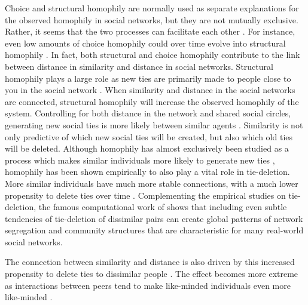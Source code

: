 \documentclass[11pt]{article}
\begin{document}
Choice and structural homophily are normally used as separate explanations for the observed homophily in social networks, but they are not mutually exclusive. Rather, it seems that the two processes can facilitate each other \cite{asikainen_cumulative_2020}. For instance, even low amounts of choice homophily could over time evolve into structural homophily \cite{asikainen_cumulative_2020,kossinets_origins_2009,taylor_exploring_2018}.
In fact, both structural and choice homophily contribute to the link between distance in similarity and distance in social networks. Structural homophily plays a large role as new ties are primarily made to people close to you in the social network \cite{bianconi_triadic_2014, peixoto_disentangling_2022}. When similarity and distance in the social networks are connected, structural homophily will increase the observed homophily of the system. Controlling for both distance in the network and shared social circles, generating new social ties is more likely between similar agents \cite{kossinets_origins_2009, bener_empirical_2016}.
\noindent Similarity is not only predictive of which new social ties will be created, but also which old ties will be deleted. Although homophily has almost exclusively been studied as a process which makes similar individuals more likely to generate new ties \cite{noel2011unfriending, bener_empirical_2016}, homophily has been shown empirically to also play a vital role in tie-deletion. More similar individuals have much more stable connections, with a much lower propensity to delete ties over time \cite{noel2011unfriending, bener_empirical_2016, mcpherson_birds_2001, kossinets_origins_2009}. Complementing the empirical studies on tie-deletion, the famous computational work of  shows that including even subtle tendencies of tie-deletion of dissimilar pairs can create global patterns of network segregation and community structures that are characteristic for many real-world social networks. 

The connection between similarity and distance is also driven by this increased propensity to delete ties to dissimilar people \cite{kossinets_origins_2009, bener_empirical_2016}. The effect becomes more extreme as interactions between peers tend to make like-minded individuals even more like-minded \cite{friedkin_social_1990, spears_social_2021}. 
\end{document}

